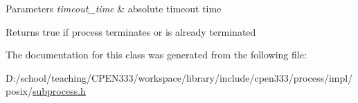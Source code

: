 \begin{DoxyParams}{Parameters}
{\em timeout\+\_\+time} & absolute timeout time \\
\hline
\end{DoxyParams}
\begin{DoxyReturn}{Returns}
true if process terminates or is already terminated 
\end{DoxyReturn}


The documentation for this class was generated from the following file\+:\begin{DoxyCompactItemize}
\item 
D\+:/school/teaching/\+C\+P\+E\+N333/workspace/library/include/cpen333/process/impl/posix/\hyperlink{impl_2posix_2subprocess_8h}{subprocess.\+h}\end{DoxyCompactItemize}
